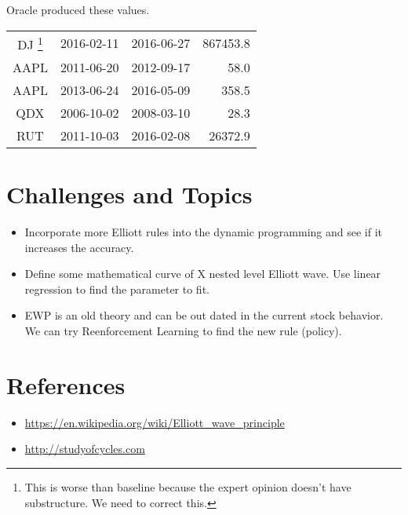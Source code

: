 \documentclass[12pt]{article}
\begin{document}
Oracle produced these values.

\begin{tabular}{cccr}
DJ \footnote{This is worse than baseline because the expert opinion doesn't have substructure. We need to correct this.} & 2016-02-11 & 2016-06-27 & 867453.8  \\
AAPL & 2011-06-20 & 2012-09-17 & 58.0 \\ 
AAPL & 2013-06-24 & 2016-05-09 & 358.5 \\
QDX  & 2006-10-02 & 2008-03-10 & 28.3 \\
RUT  & 2011-10-03 & 2016-02-08 & 26372.9 \\
\end{tabular}

\section{Challenges and Topics}

\begin{itemize}
\item Incorporate more Elliott rules into the dynamic programming and
  see if it increases the accuracy.
\item Define some mathematical curve of X nested level Elliott
  wave. Use linear regression to find the parameter to fit.
\item EWP is an old theory and can be out dated in the current stock
  behavior. We can try Reenforcement Learning to find the new rule
  (policy).
\end{itemize}

\section*{References}

\begin{itemize}
\item \url{https://en.wikipedia.org/wiki/Elliott_wave_principle}
\item \url{http://studyofcycles.com}
\end{itemize}
     
\end{document}
